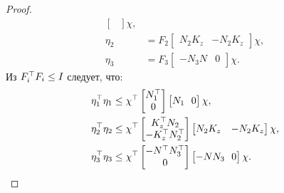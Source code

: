 \begin{proof}
\begin{align}
\begin{bmatrix}
		\end{bmatrix}\chi ,\\
		\eta_2&={F}_2\begin{bmatrix}
			{N}_2{K}_z & -{N}_2{K}_z
		\end{bmatrix}\chi, \\
		\label{eq:eta_3_thm3}
		\eta_3&={F}_3\begin{bmatrix}
			-{N}_3{N} & 0
		\end{bmatrix}\chi.
	\end{align}
	Из ${F}_i^\top{F}_i\leq {I}$ следует, что:
	\begin{align}    
		\eta_1^\top\eta_1 &\leq \chi^\top \begin{bmatrix}
			{N}_1^\top \\ 0  
		\end{bmatrix}\begin{bmatrix}
			{N}_1 \ \ 0  
		\end{bmatrix} \chi,
		\\
		\eta_2^\top\eta_2 &\leq \chi^\top \begin{bmatrix}
			{K}_z^\top{N}_2 \\ -{K}_z^\top{N}_2^\top  
		\end{bmatrix}\begin{bmatrix}
			{N}_2{K}_z & -{N}_2{K}_z
		\end{bmatrix} \chi,
		\\
		\eta_3^\top\eta_3 &\leq \chi^\top \begin{bmatrix}
			-{N}^\top{N}_3^\top \\ 0  
		\end{bmatrix}\begin{bmatrix}
			-{N}{N}_3 \ \ 0  
		\end{bmatrix} \chi.
	\end{align}
	

\end{proof}
